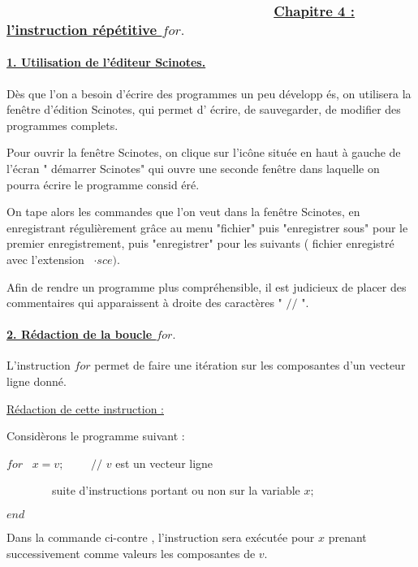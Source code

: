 \documentclass{article}
\begin{document}
\subsubsection{ \ \ \ \ \ \ \ \ \ \ \ \ \ \ \ \ \ \ \ \ \ \ \ \ \ \ \ \ \ \
\ \ \ \ \ \protect\underline{Chapitre 4 : l'instruction r\'{e}p\'{e}titive $%
for.$}}

\paragraph{\protect\underline{1. Utilisation de l'\'{e}diteur Scinotes.}}

D\`{e}s que l'on a besoin d'\'{e}crire des programmes un peu d\'{e}velopp%
\'{e}s, on utilisera la fen\^{e}tre d'\'{e}dition Scinotes, qui permet d'%
\'{e}crire, de sauvegarder, de modifier des programmes complets.

Pour ouvrir la fen\^{e}tre Scinotes, on clique sur l'ic\^{o}ne situ\'{e}e en
haut \`{a} gauche de l'\'{e}cran " d\'{e}marrer Scinotes" qui ouvre une
seconde fen\^{e}tre dans laquelle on pourra \'{e}crire le programme consid%
\'{e}r\'{e}.

On tape alors les commandes que l'on veut dans la fen\^{e}tre Scinotes, en
enregistrant r\'{e}guli\`{e}rement gr\^{a}ce au menu "fichier" puis
"enregistrer sous" pour le premier enregistrement, puis "enregistrer" pour
les suivants ( fichier enregistr\'{e} avec l'extension \ $\cdot sce).$

\bigskip

Afin de rendre un programme plus compr\'{e}hensible, il est judicieux de
placer des commentaires qui apparaissent \`{a} droite des caract\`{e}res " $%
//$ ".

\paragraph{ \protect\underline{2. R\'{e}daction de la boucle $for.$}}

L'instruction $for$ permet de faire une it\'{e}ration sur les composantes
d'un vecteur ligne donn\'{e}.

\underline{R\'{e}daction de cette instruction :}

Consid\`{e}rons le programme suivant :

$for$ \ $x=v;$ \ \ \ \ $//$ $v$ est un vecteur ligne

\ \ \ \ \ \ \ \ suite d'instructions portant ou non sur la variable $x;$

$end$

Dans la commande ci-contre , l'instruction sera ex\'{e}cut\'{e}e pour $x$
prenant successivement comme valeurs les composantes de $v$.
\end{document}

